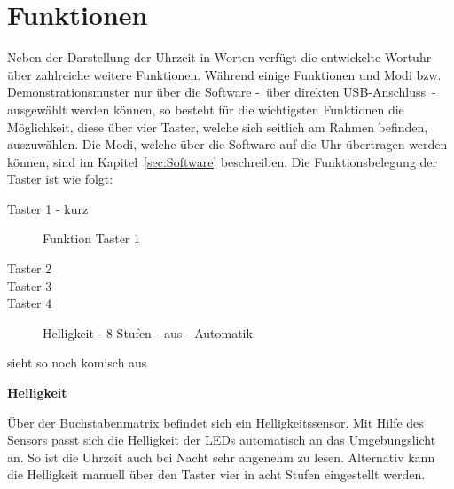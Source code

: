 
\section{Funktionen}
\label{sec:Funktionen}



Neben der Darstellung der Uhrzeit in Worten verfügt die entwickelte Wortuhr über zahlreiche weitere Funktionen. Während einige Funktionen und Modi bzw. Demonstrationsmuster nur über die Software -~über direkten USB-Anschluss~- ausgewählt werden können, so besteht für die wichtigsten Funktionen die Möglichkeit, diese über vier Taster, welche sich seitlich am Rahmen befinden, auszuwählen. Die Modi, welche über die Software auf die Uhr übertragen werden können, sind im Kapitel~\ref{sec:Software} beschreiben. Die Funktionsbelegung der Taster ist wie folgt:

 

\begin{description}

\item[Taster 1 - kurz] Funktion Taster 1
\item[Taster 2]
\item[Taster 3]
\item[Taster 4] Helligkeit - 8 Stufen - aus - Automatik

\end {description}
 
 sieht so noch komisch aus


\textbf{Helligkeit}

Über der Buchstabenmatrix befindet sich ein Helligkeitssensor. Mit Hilfe des Sensors passt sich die Helligkeit der LEDs automatisch an das Umgebungslicht an. So ist die Uhrzeit auch bei Nacht sehr angenehm zu lesen. Alternativ kann die Helligkeit manuell über den Taster vier in acht Stufen eingestellt werden.

